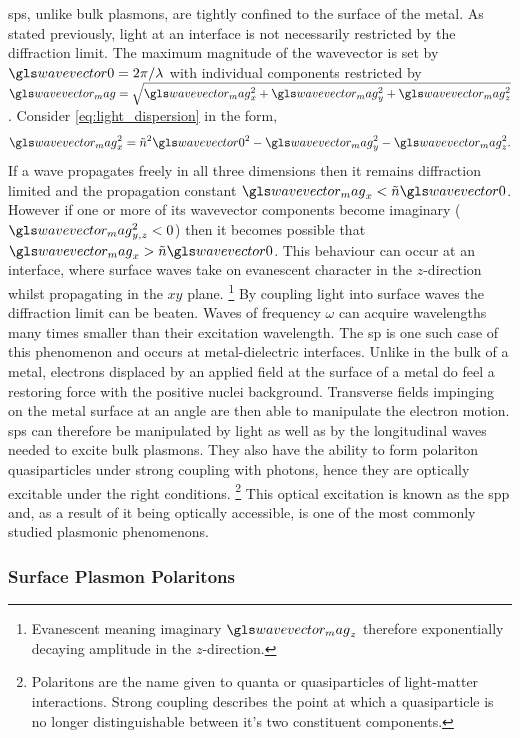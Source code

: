 \documentclass{article}
\begin{document}
\Glspl{sp}, unlike bulk plasmons, are tightly confined to the surface of the metal. As stated previously, light at an interface is not necessarily restricted by the diffraction limit. The maximum magnitude of the wavevector is set by $\wvz=2\pi/\lambda$ with individual components restricted by $\wvm = \sqrt{\wvm_x^2 + \wvm_y^2 + \wvm_z^2}$. Consider \eqref{eq:light_dispersion} in the form,
\begin{equation}
	\wvm_x^2 = \refind^2 \wvz^2 - \wvm_y^2 - \wvm_z^2.
\end{equation}
If a wave propagates freely in all three dimensions then it remains diffraction limited and the propagation constant $\wvm_x < \refind\wvz$. However if one or more of its wavevector components become imaginary ($\wvm_{y,z}^2 < 0$) then it becomes possible that $\wvm_x > \refind\wvz$. This behaviour can occur at an interface, where surface waves take on evanescent character in the $z$-direction whilst propagating in the $xy$ plane.%
\footnote{Evanescent meaning imaginary $\wvm_z$ therefore exponentially decaying amplitude in the $z$-direction.}
By coupling light into surface waves the diffraction limit can be beaten. Waves of frequency $\omega$ can acquire wavelengths many times smaller than their excitation wavelength. The \gls{sp} is one such case of this phenomenon and occurs at metal-dielectric interfaces. %
Unlike in the bulk of a metal, electrons displaced by an applied field at the surface of a metal do feel a restoring force with the positive nuclei background. Transverse fields impinging on the metal surface at an angle are then able to manipulate the electron motion. \Glspl{sp} can therefore be manipulated by light as well as by the longitudinal waves needed to excite bulk plasmons.
They also have the ability to form polariton quasiparticles under strong coupling with photons, hence they are  optically excitable under the right conditions.%
\footnote{Polaritons are the name given to quanta or quasiparticles of light-matter interactions. Strong coupling describes the point at which a quasiparticle is no longer distinguishable between it's two constituent components.}
This optical excitation is known as the \gls{spp} and, as a result of it being optically accessible, is one of the most commonly studied plasmonic phenomenons.

\subsubsection{Surface Plasmon Polaritons}
\end{document}
